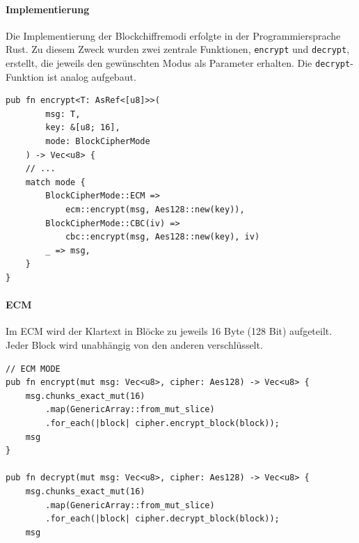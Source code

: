 \paragraph{Implementierung}
Die Implementierung der Blockchiffremodi erfolgte in der Programmiersprache Rust. Zu diesem Zweck wurden zwei zentrale Funktionen, \texttt{encrypt} und \texttt{decrypt}, erstellt, die jeweils den gewünschten Modus als Parameter erhalten.
Die \texttt{decrypt}-Funktion ist analog aufgebaut. 
\begin{verbatim}
pub fn encrypt<T: AsRef<[u8]>>(
        msg: T, 
        key: &[u8; 16], 
        mode: BlockCipherMode
    ) -> Vec<u8> {
    // ...
    match mode {
        BlockCipherMode::ECM => 
            ecm::encrypt(msg, Aes128::new(key)),
        BlockCipherMode::CBC(iv) => 
            cbc::encrypt(msg, Aes128::new(key), iv)
        _ => msg,
    }
}
\end{verbatim}
\paragraph{ECM}
Im ECM wird der Klartext in Blöcke zu jeweils 16 Byte (128 Bit) aufgeteilt. Jeder Block wird unabhängig von den anderen verschlüsselt.
\begin{verbatim}
// ECM MODE
pub fn encrypt(mut msg: Vec<u8>, cipher: Aes128) -> Vec<u8> {
    msg.chunks_exact_mut(16)
        .map(GenericArray::from_mut_slice)
        .for_each(|block| cipher.encrypt_block(block));
    msg
}

pub fn decrypt(mut msg: Vec<u8>, cipher: Aes128) -> Vec<u8> {
    msg.chunks_exact_mut(16)
        .map(GenericArray::from_mut_slice)
        .for_each(|block| cipher.decrypt_block(block));
    msg
\end{verbatim}
